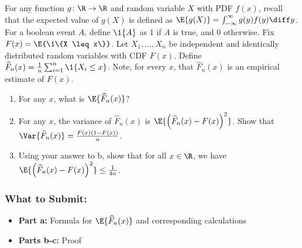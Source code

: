 \documentclass{article}
\begin{document}
\begin{bprob}
    For any function $g \colon \R \to \R$ and random variable $X$ with PDF $f(x)$, recall that the expected value of $g(X)$ is defined as $\E{g(X)} = \int_{-\infty}^\infty g(y) f(y) \diff y$. For a boolean event $A$, define $\1\{ A \}$ as $1$ if $A$ is true, and $0$ otherwise. Fix $F(x) = \E{\1\{X \leq x\}}$. Let $X_1,\ldots,X_n$ be independent and identically distributed random variables with CDF $F(x)$. Define $\widehat{F}_n(x) = \frac{1}{n} \sum_{i=1}^n \1\{X_i \leq x\}$. Note, for every $x$, that $\widehat{F}_n(x)$ is an empirical estimate of  $F(x)$.
    \begin{enumerate}
      \item {} For any $x$, what is $\E{\widehat{F}_n(x)}$?
      \item {} For any $x$, the variance of $\widehat{F}_n(x)$ is $\E{\left( \widehat{F}_n(x) -  F(x) \right)^2 }$.  Show that $\Var{\widehat{F}_n(x)} = \frac{F(x)(1-F(x))}{n}$.
      \item {} Using your answer to b, show that for all $x\in \R$, we have  $\displaystyle \E{ \left( \widehat{F}_n(x) - F(x) \right)^2 } \leq \tfrac{1}{4n}$.  
    \end{enumerate}
    
    \subsubsection*{What to Submit:}
    \begin{itemize}
        \item \textbf{Part a:} Formula for $\E{\widehat{F}_n(x)}$ and corresponding calculations
        \item \textbf{Parts b-c:} Proof
    \end{itemize}
\end{bprob}
\end{document}
